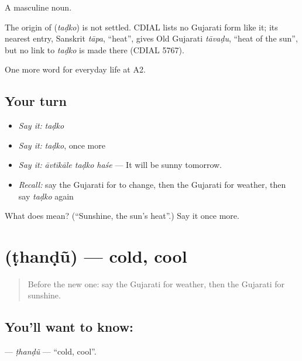 A masculine noun.

\begin{cousinweb}
The origin of \textbf{} (\emph{taḍko}) is not settled. CDIAL lists no Gujarati form like it; its nearest entry, Sanskrit \emph{tāpa}, \textquotedblleft{}heat\textquotedblright{}, gives Old Gujarati \emph{tāvaḍu}, \textquotedblleft{}heat of the sun\textquotedblright{}, but no link to \emph{taḍko} is made there (CDIAL 5767).
\end{cousinweb}

\begin{grammarlens}[title={What you've built}]
One more word for everyday life at A2.
\end{grammarlens}

\subsection*{Your turn}
\begin{itemize}
\raggedright
  \item \emph{Say it:} \emph{taḍko}
  \item \emph{Say it:} \emph{taḍko}, once more
  \item \emph{Say it:} \emph{āvtīkāle taḍko haśe} — It will be sunny tomorrow.
  \item \emph{Recall:} say the Gujarati for to change, then the Gujarati for weather, then say \emph{taḍko} again
\end{itemize}

\begin{tcolorbox}[breakable,colback=teal!4,colframe=teal!35!black,title={Before you move on}]
What does  mean? (\textquotedblleft{}Sunshine, the sun's heat\textquotedblright{}.) Say it once more.
\end{tcolorbox}
\section[\texorpdfstring{\gu{ઠંડું} (ṭhanḍũ)}{ઠંડું (ṭhanḍũ)}]{ (ṭhanḍũ) — cold, cool}

\label{lesson:GU-C213-thandu}



\begin{quote}
Before the new one: say the Gujarati for weather, then the Gujarati for sunshine.
\end{quote}

\subsection*{You'll want to know: }
\textbf{} — \emph{ṭhanḍũ} — \textquotedblleft{}cold, cool\textquotedblright{}.

